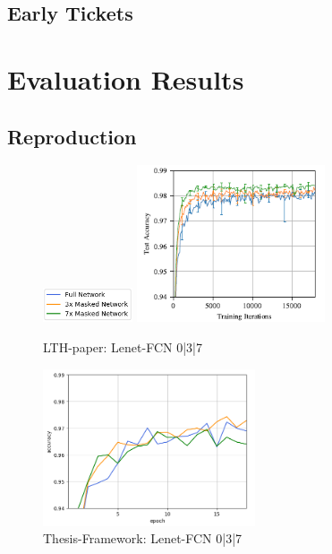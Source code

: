 \subsection*{Early Tickets}




\section{Evaluation Results}
\subsection*{Reproduction}
\begin{figure}
	\begin{minipage}{\textwidth}
		\centering
		\includegraphics[width=100px]{gfx/7-Evaluation/LTH_1_legend.png}
	\end{minipage}
	\begin{minipage}{0.5\textwidth}
		\centering
		\includegraphics[height=175px]{gfx/7-Evaluation/LTH_1.png}
		\caption*{LTH-paper: Lenet-FCN 0|3|7}
		\label{?}
	\end{minipage}\hfill
	\begin{minipage}{0.5\textwidth}
		\centering
		\includegraphics[height=175px]{gfx/Experiments/Reproduction-MNIST-FCN/accuracy/LTH_1.png}
		\caption*{Thesis-Framework: Lenet-FCN 0|3|7}
		\label{?}
	\end{minipage}
\end{figure}

